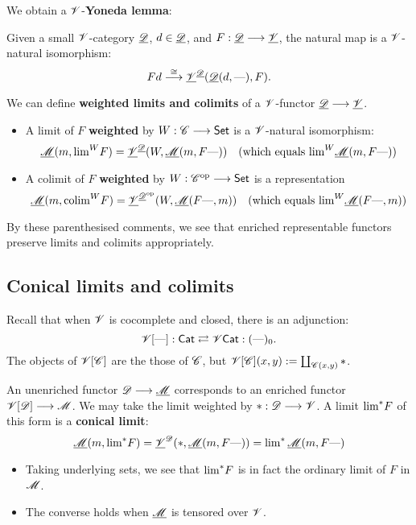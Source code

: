 \documentclass[11pt]{article}
\begin{document}
\begin{8. Weighted limits and colimits}
\begin{itemise}
\begin{itemize}
\end{itemize}
\item We obtain a $\mathscr{V}$-\textbf{Yoneda lemma}:
\begin{lem*}
Given a small $\mathscr{V}$-category 
$\underline{\mathscr{D}}$, $d\in\underline{\mathscr{D}}$, and $F:\underline{\mathscr{D}}\longrightarrow\underline{\mathscr{V}}$, the natural map is a $\mathscr{V}$-natural isomorphism:
\[Fd\overset{\cong}{\longrightarrow}\underline{\mathscr{V}}^{\underline{\mathscr{D}}}(\underline{\mathscr{D}}(d,\textup{---} ),F).\]
\end{lem*}
\item We can define \textbf{weighted limits and colimits} of a $\mathscr{V}$-functor $\underline{\mathscr{D}}\longrightarrow\underline{\mathscr{V}}$.
\begin{itemize}\squishlist
\setlength{\parindent}{.25in}
\item A limit of $F$ \textbf{weighted} by $W:\mathscr{C}\longrightarrow\operatorname{{\mathsf{Set}}}$ is a $\mathscr{V}$-natural isomorphism:
\[\underline{\mathscr{M}}(m,\textstyle\operatorname*{lim}^W\! F)=\underline{\mathscr{V}}^{\underline{\mathscr{D}}}(W,\underline{\mathscr{M}}(m,F\textup{---} ))\quad \textup{(which equals $\operatorname*{lim}^W\!\underline{\mathscr{M}}(m,F\textup{---} )$)}\]
\item A colimit of $F$ \textbf{weighted} by $W:\mathscr{C}^{\textup{op}}\longrightarrow\operatorname{{\mathsf{Set}}}$ is a representation
\[\underline{\mathscr{M}}(m,\textstyle\operatorname*{colim}^W\! F)= \underline{\mathscr{V}}^{ \underline{\mathscr{D}}^{\textup{op}}}(W,\underline{\mathscr{M}}(F\textup{---},m ))\quad \textup{(which equals $\operatorname*{lim}^W\!\underline{\mathscr{M}}(F\textup{---} ,m)$)}\]
\end{itemize}
By these parenthesised comments, we see that enriched representable functors preserve limits and colimits appropriately.
\end{itemise}
\subsection*{Conical limits and colimits}
\begin{itemise}
\setlength{\parindent}{.25in}
\item Recall that when $\mathscr{V}$ is cocomplete and closed, there is an adjunction: 
\[\mathscr{V}[\textup{---} ]:\operatorname{{\mathsf{Cat}}}\rightleftarrows\mathsf{\mathscr{V}Cat}:(\textup{---} )_0.\]
The objects of $\mathscr{V}[\mathscr{C}]$ are the those of $\mathscr{C}$, but $\mathscr{V}[\mathscr{C}](x,y):=\coprod_{\mathscr{C}(x,y)}*$.
\item An unenriched functor $\mathscr{D}\longrightarrow\underline{\mathscr{M}}$ corresponds to an enriched functor $\mathscr{V}[\mathscr{D}]\longrightarrow \mathscr{M}$. We may take the limit weighted by $*:\mathscr{D}\longrightarrow\mathscr{V}$. A limit $\operatorname*{lim}^*\!F$ of this form is a \textbf{conical limit}:
\[\underline{\mathscr{M}}(m,\textstyle\operatorname*{lim}^*\!F)=
\underline{\mathscr{V}}^{\mathscr{D}}(*,\underline{\mathscr{M}}(m,F\textup{---} ))=
\textstyle\operatorname*{lim}^*\underline{\mathscr{M}}(m,F\textup{---} )\]
\begin{itemize}\squishlist
\setlength{\parindent}{.25in}
\item Taking underlying sets, we see that $\operatorname*{lim}^*\!F$ is in fact the ordinary limit of $F$ in $\mathscr{M}$.
\item The converse holds when $\underline{\mathscr{M}}$ is tensored over $\mathscr{V}$.
\end{itemize}
\end{itemise}

\end{8. Weighted limits and colimits}
\end{document}
